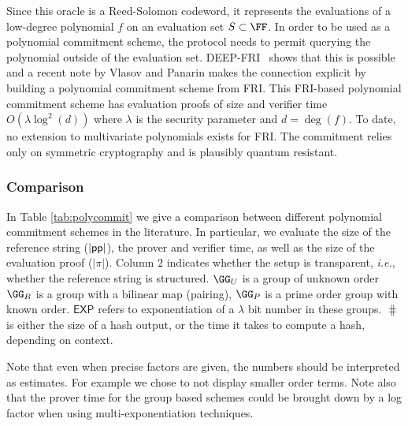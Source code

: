 Since this oracle is a Reed-Solomon codeword, it represents the evaluations of a low-degree polynomial $f$ on an evaluation set $S \subset \FF$. In order to be used as a polynomial commitment scheme, the protocol needs to permit querying the polynomial outside of the evaluation set. DEEP-FRI~\cite{DEEPFRI} shows that this is possible and a recent note by Vlasov and Panarin \cite{MatterLabs} makes the connection explicit by building a polynomial commitment scheme from FRI. 
This FRI-based polynomial commitment scheme has evaluation proofs of size and verifier time $O(\lambda \log^2(d))$ where $\lambda$ is the security parameter and $d = \deg(f)$. To date, no extension to multivariate polynomials exists for FRI. The commitment relies only on symmetric cryptography and is plausibly quantum resistant.

\subsubsection{Comparison}

In Table \ref{tab:polycommit} we give a comparison between different polynomial commitment schemes in the literature. In particular, we evaluate the size of the reference string ($|\textsf{pp}|$), the prover and verifier time, as well as the size of the evaluation proof ($|\pi|$). Column $2$ indicates whether the setup is transparent, \emph{i.e.}, whether the reference string is structured. $\GG_U$ is a group of unknown order $\GG_{B}$ is a group with a bilinear map (pairing), $\GG_{P}$ is a prime order group with known order. $\textsf{EXP}$ refers to exponentiation of a $\lambda$ bit number in these groups. $\hash$ is either the size of a hash output, or the time it takes to compute a hash, depending on context. 

Note that even when precise factors are given, the numbers should be interpreted as estimates. For example we chose to not display smaller order terms.
Note also that the prover time for the group based schemes could be brought down by a log factor when using multi-exponentiation techniques.

